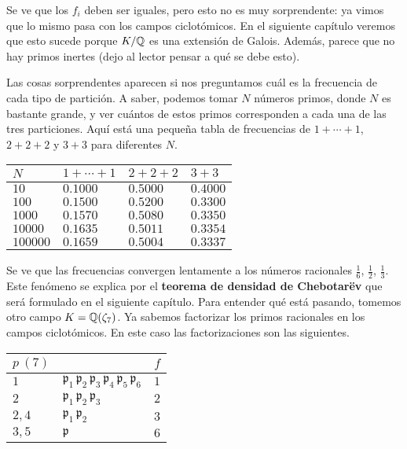 Se ve que los $f_i$ deben ser iguales, pero esto no es muy sorprendente:
ya vimos que lo mismo pasa con los campos ciclotómicos. En el siguiente capítulo
veremos que esto sucede porque $K/\mathbb{Q}$ es una extensión de Galois.
Además, parece que no hay primos inertes (dejo al lector pensar a qué
se debe esto).

Las cosas sorprendentes aparecen si nos preguntamos cuál es la frecuencia de
cada tipo de partición. A saber, podemos tomar $N$ números primos, donde $N$ es
bastante grande, y ver cuántos de estos primos corresponden a cada una de las
tres particiones. Aquí está una pequeña tabla de frecuencias de $1+\cdots+1$,
$2+2+2$ y $3+3$ para diferentes $N$.

\begin{center}
  \renewcommand{\arraystretch}{1.5}
  \begin{tabular}{lx{2cm}x{2cm}x{2cm}}
    $N$      & $1+\cdots+1$ & $2+2+2$ & $3+3$ \tabularnewline
    \hline
    $10$     & $0.1000$ & $0.5000$ & $0.4000$ \tabularnewline
    $100$    & $0.1500$ & $0.5200$ & $0.3300$ \tabularnewline
    $1000$   & $0.1570$ & $0.5080$ & $0.3350$ \tabularnewline
    $10000$  & $0.1635$ & $0.5011$ & $0.3354$ \tabularnewline
    $100000$ & $0.1659$ & $0.5004$ & $0.3337$ \tabularnewline
  \end{tabular}
\end{center}

Se ve que las frecuencias convergen lentamente a los números racionales
$\frac{1}{6}$, $\frac{1}{2}$, $\frac{1}{3}$. Este fenómeno se explica por
el \textbf{teorema de densidad de Chebotarëv} que será formulado en el siguiente
capítulo. Para entender qué está pasando, tomemos otro campo
$K = \mathbb{Q} (\zeta_7)$. Ya sabemos factorizar los primos racionales en los campos
ciclotómicos. En este caso las factorizaciones son las siguientes.

\begin{center}
  \renewcommand{\arraystretch}{1.5}
  \begin{tabular}{lx{3cm}c}
    $p~(7)$ &  & $f$ \tabularnewline
    \hline
    $1$ & $\mathfrak{p}_1\,\mathfrak{p}_2\,\mathfrak{p}_3\,\mathfrak{p}_4\,\mathfrak{p}_5\,\mathfrak{p}_6$ & $1$ \tabularnewline
    $2$ & $\mathfrak{p}_1\,\mathfrak{p}_2\,\mathfrak{p}_3$ & $2$ \tabularnewline
    $2,4$ & $\mathfrak{p}_1\,\mathfrak{p}_2$ & $3$ \tabularnewline
    $3,5$ & $\mathfrak{p}$ & $6$ \tabularnewline
  \end{tabular}
\end{center}

